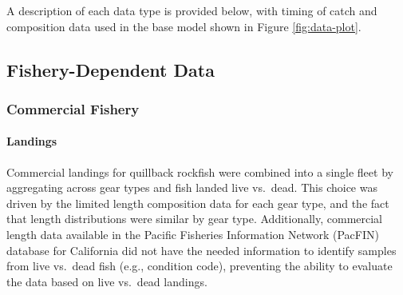 \documentclass[11pt,
  english,
  letterpaper,
]{article}
\begin{document}
\tagstructend


A description of each data type is provided below, with timing of catch and composition data used in the base model shown in Figure \ref{fig:data-plot}.

\leavevmode\tagmcend\tagstructend\par


\hypertarget{fishery-dependent-data}{%
\subsection{Fishery-Dependent Data}\label{fishery-dependent-data}}

\leavevmode\tagmcend\tagstructend


\hypertarget{commercial-fishery}{%
\subsubsection{Commercial Fishery}\label{commercial-fishery}}

\leavevmode\tagmcend\tagstructend


\hypertarget{landings}{%
\paragraph{Landings}\label{landings}}

\leavevmode\tagmcend\tagstructend


Commercial landings for quillback rockfish were combined into a single fleet by aggregating across gear types and fish landed live vs.~dead. This choice was driven by the limited length composition data for each gear type, and the fact that length distributions were similar by gear type. Additionally, commercial length data available in the Pacific Fisheries Information Network (PacFIN) database for California did not have the needed information to identify samples from live vs.~dead fish (e.g., condition code), preventing the ability to evaluate the data based on live vs.~dead landings.

\leavevmode\tagmcend\tagstructend\par
\end{document}
